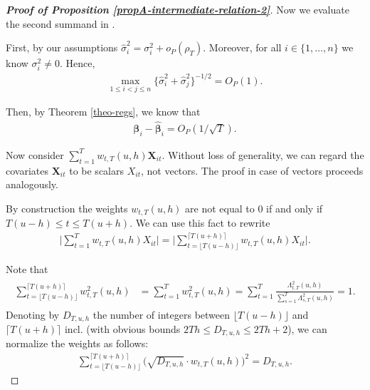 \documentclass[a4paper,12pt]{article}
\makeatletter
\renewcommand{\eqref}[1]{\tagform@{\ref{#1}}}
\makeatother
\begin{document}
\begin{proof}[\textnormal{\textbf{Proof of Proposition \ref{propA-intermediate-relation-2}}}]
Now we evaluate the second summand in \eqref{ineq-diff-1}.

First, by our assumptions $\widehat{\sigma}_i^2 = \sigma_i^2 + o_P(\rho_T)$. Moreover, for all $i \in \{1, \ldots, n\}$ we know $\sigma_i^2 \neq 0$. Hence, 
\begin{align}\label{ineq-diff-6}
\max_{1\le i < j \le n}\{\widehat{\sigma}_i^2+ \widehat{\sigma}_j^2 \}^{-1/2}  = O_P(1).
\end{align}

Then, by Theorem \ref{theo-regs}, we know that 
\begin{align}\label{ineq-diff-7}
\bm{\beta}_i - \widehat{\bm{\beta}}_i = O_P(1/\sqrt{T}).
\end{align}

Now consider $\sum_{t=1}^T w_{t,T}(u,h) \mathbf{X}_{it}$. Without loss of generality, we can regard the covariates $\mathbf{X}_{it}$ to be scalars $X_{it}$, not vectors. The proof in case of vectors proceeds analogously.

 
By construction the weights $w_{t, T}(u, h)$ are not equal to $0$ if and only if \linebreak $T(u-h) \le t \le T(u+h)$. We can use this fact to rewrite
\begin{align*}
\Big| \sum_{t=1}^T w_{t,T}(u,h) X_{it}   \Big|  = \Big| \sum_{t=\lfloor T(u-h) \rfloor}^{\lceil T(u+h) \rceil} w_{t,T}(u,h)X_{it}   \Big|.
\end{align*}

Note that
\begin{align}\label{sum-weights}
\begin{split}
\sum_{t=\lfloor T(u-h) \rfloor}^{\lceil T(u+h) \rceil} w^2_{t,T}(u,h) &= \sum_{t=1}^T w^2_{t,T}(u,h) = \sum_{t=1}^T\frac{\Lambda^2_{t,T}(u,h)}{\sum\nolimits_{s=1}^T\Lambda^2_{s,T}(u,h) } = 1.
\end{split}
\end{align}
Denoting by $D_{T, u, h}$ the number of integers between $\lfloor T(u-h) \rfloor$ and $\lceil T(u+h) \rceil$ incl. (with obvious bounds $2Th \leq D_{T, u, h} \leq 2Th + 2$), we can normalize the weights as follows:
\begin{align*}
\sum_{t=\lfloor T(u-h) \rfloor}^{\lceil T(u+h) \rceil} \big(\sqrt{D_{T, u, h}}\cdot w_{t,T}(u,h)\big)^2 = D_{T, u, h}.
\end{align*}


\end{proof}
\end{document}
